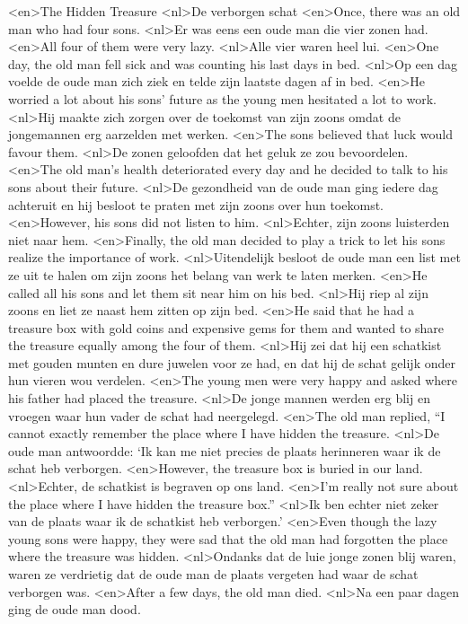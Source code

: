 <en>The Hidden Treasure
<nl>De verborgen schat
<en>Once, there was an old man who had four sons.
<nl>Er was eens een oude man die vier zonen had.
<en>All four of them were very lazy.
<nl>Alle vier waren heel lui.
<en>One day, the old man fell sick and was counting his last days in bed.
<nl>Op een dag voelde de oude man zich ziek en telde zijn laatste dagen af in bed.
<en>He worried a lot about his sons’ future as the young men hesitated a lot to work.
<nl>Hij maakte zich zorgen over de toekomst van zijn zoons omdat de jongemannen erg aarzelden met werken.
<en>The sons believed that luck would favour them.
<nl>De zonen geloofden dat het geluk ze zou bevoordelen.
<en>The old man’s health deteriorated every day and he decided to talk to his sons about their future.
<nl>De gezondheid van de oude man ging iedere dag achteruit en hij besloot te praten met zijn zoons over hun toekomst.
<en>However, his sons did not listen to him.
<nl>Echter, zijn zoons luisterden niet naar hem.
<en>Finally, the old man decided to play a trick to let his sons realize the importance of work.
<nl>Uitendelijk besloot de oude man een list met ze uit te halen om zijn zoons het belang van werk te laten merken.
<en>He called all his sons and let them sit near him on his bed.
<nl>Hij riep al zijn zoons en liet ze naast hem zitten op zijn bed.
<en>He said that he had a treasure box with gold coins and expensive gems for them and wanted to share the treasure equally among the four of them.
<nl>Hij zei dat hij een schatkist met gouden munten en dure juwelen voor ze had, en dat hij de schat gelijk onder hun vieren wou verdelen.
<en>The young men were very happy and asked where his father had placed the treasure.
<nl>De jonge mannen werden erg blij en vroegen waar hun vader de schat had neergelegd.
<en>The old man replied, “I cannot exactly remember the place where I have hidden the treasure.
<nl>De oude man antwoordde: `Ik kan me niet precies de plaats herinneren waar ik de schat heb verborgen. 
<en>However, the treasure box is buried in our land.
<nl>Echter, de schatkist is begraven op ons land.
<en>I’m really not sure about the place where I have hidden the treasure box.”
<nl>Ik ben echter niet zeker van de plaats waar ik de schatkist heb verborgen.'
<en>Even though the lazy young sons were happy, they were sad that the old man had forgotten the place where the treasure was hidden.
<nl>Ondanks dat de luie jonge zonen blij waren, waren ze verdrietig dat de oude man de plaats vergeten had waar de schat verborgen was. 
<en>After a few days, the old man died.
<nl>Na een paar dagen ging de oude man dood.
